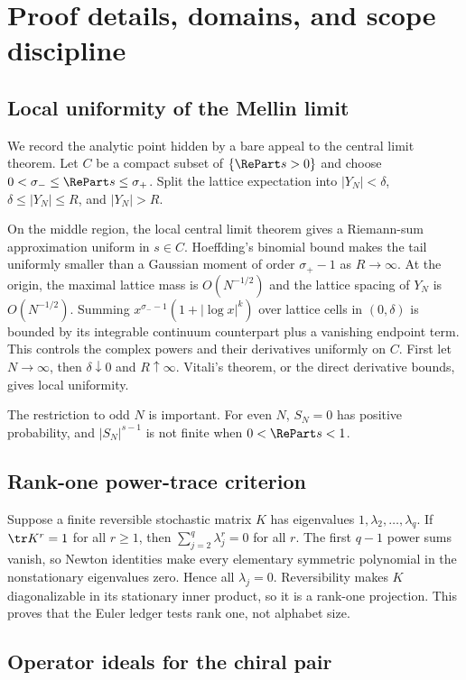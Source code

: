 \section{Proof details, domains, and scope discipline}
\label{app:proofs}

\subsection{Local uniformity of the Mellin limit}

We record the analytic point hidden by a bare appeal to the central limit
theorem. Let $C$ be a compact subset of $\{\RePart s>0\}$ and choose
$0<\sigma_-\le\RePart s\le\sigma_+$. Split the lattice expectation into
$|Y_N|<\delta$, $\delta\le |Y_N|\le R$, and $|Y_N|>R$.

On the middle region, the local central limit theorem gives a Riemann-sum
approximation uniform in $s\in C$. Hoeffding's binomial bound makes the tail
uniformly smaller than a Gaussian moment of order $\sigma_+-1$ as
$R\to\infty$. At the origin, the maximal lattice mass is $O(N^{-1/2})$ and
the lattice spacing of $Y_N$ is $O(N^{-1/2})$. Summing
$x^{\sigma_--1}(1+|\log x|^k)$ over lattice cells in $(0,\delta)$ is bounded
by its integrable continuum counterpart plus a vanishing endpoint term.
This controls the complex powers and their derivatives uniformly on $C$.
First let $N\to\infty$, then $\delta\downarrow0$ and $R\uparrow\infty$.
Vitali's theorem, or the direct derivative bounds, gives local uniformity.

The restriction to odd $N$ is important. For even $N$, $S_N=0$ has positive
probability, and $|S_N|^{s-1}$ is not finite when $0<\RePart s<1$.

\subsection{Rank-one power-trace criterion}

Suppose a finite reversible stochastic matrix $K$ has eigenvalues
$1,\lambda_2,\ldots,\lambda_q$. If $\tr K^r=1$ for all $r\ge1$, then
$\sum_{j=2}^q\lambda_j^r=0$ for all $r$. The first $q-1$ power sums vanish,
so Newton identities make every elementary symmetric polynomial in the
nonstationary eigenvalues zero. Hence all $\lambda_j=0$. Reversibility makes
$K$ diagonalizable in its stationary inner product, so it is a rank-one
projection. This proves that the Euler ledger tests rank one, not alphabet
size.

\subsection{Operator ideals for the chiral pair}


